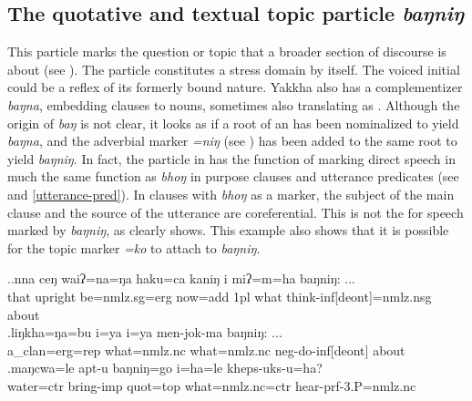 \subsection{The quotative and textual topic particle \emph{baŋniŋ}}
	
This particle marks the question or topic that a broader section of discourse is about (see \Next). The particle constitutes a stress domain by itself. The voiced initial could be a reflex of its formerly bound nature. Yakkha also has a complementizer \emph{baŋna}, embedding clauses to nouns, sometimes also translating as . Although the origin of \emph{baŋ} is not clear, it looks as if a root of an  has been  nominalized to yield \emph{baŋna}, and the  adverbial  marker  \emph{=niŋ} (see ) has been added to the same root to yield \emph{baŋniŋ}. In fact, the particle in \Next[c] has the function of marking direct speech in much the same function as \emph{bhoŋ} in purpose clauses and utterance predicates (see  and \ref{utterance-pred}). In clauses with  \emph{bhoŋ} as a  marker, the subject of the main clause and the source of the utterance are coreferential. This is not the  for speech marked by  \emph{baŋniŋ}, as \Next[c] clearly shows. This example also shows that it is possible for the topic marker \emph{=ko} to attach to  \emph{baŋniŋ}.

\ex.\ag.nna  ceŋ    waiʔ=na=ŋa      haku=ca   kaniŋ i  miʔ=m=ha baŋniŋ: ...\\
that upright be{\sc [3sg]=nmlz.sg=erg} now{\sc =add} {\sc 1pl} what think{\sc -inf[deont]=nmlz.nsg} about\\
 
\bg.\label{ex-bu}liŋkha=ŋa=bu         i=ya                i=ya                men-jok-ma              baŋniŋ: ...\\
a\_clan{\sc =erg=rep}  what{\sc =nmlz.nc} what{\sc =nmlz.nc} {\sc neg-}do{\sc -inf[deont]} about\\
 
\bg.maŋcwa=le          apt-u     baŋniŋ=go   i=ha=le        kheps-uks-u=ha?\\
water{\sc =ctr} bring{\sc -imp} {\sc quot=top} what{\sc =nmlz.nc=ctr} hear{\sc -prf-3.P=nmlz.nc} \\
 


